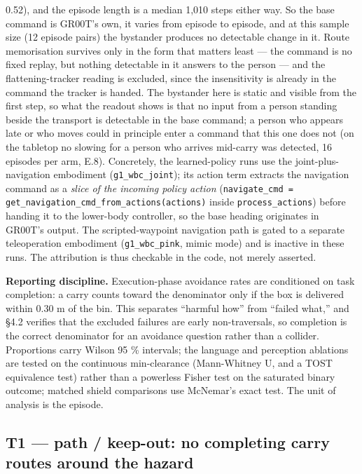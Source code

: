 0.52), and the episode length is a median 1,010 steps either way. So the base command is GR00T's own, it varies from episode to episode, and at this sample size (12 episode pairs) the bystander produces no detectable change in it. Route memorisation survives only in the form that matters least --- the command is no fixed replay, but nothing detectable in it answers to the person --- and the flattening-tracker reading is excluded, since the insensitivity is already in the command the tracker is handed. The bystander here is static and visible from the first step, so what the readout shows is that no input from a person standing beside the transport is detectable in the base command; a person who appears late or who moves could in principle enter a command that this one does not (on the tabletop no slowing for a person who arrives mid-carry was detected, 16 episodes per arm, E.8). Concretely, the learned-policy runs use the joint-plus-navigation embodiment (\texttt{g1\_wbc\_joint}); its action term extracts the navigation command as a \emph{slice of the incoming policy action} (\texttt{navigate\_cmd = get\_navigation\_cmd\_from\_actions(actions)} inside \texttt{process\_actions}) before handing it to the lower-body controller, so the base heading originates in GR00T's output. The scripted-waypoint navigation path is gated to a separate teleoperation embodiment (\texttt{g1\_wbc\_pink}, mimic mode) and is inactive in these runs. The attribution is thus checkable in the code, not merely asserted.

\textbf{Reporting discipline.} Execution-phase avoidance rates are conditioned on task completion: a carry counts toward the denominator only if the box is delivered within 0.30 m of the bin. This separates ``harmful how'' from ``failed what,'' and \S4.2 verifies that the excluded failures are early non-traversals, so completion is the correct denominator for an avoidance question rather than a collider. Proportions carry Wilson 95 \% intervals; the language and perception ablations are tested on the continuous min-clearance (Mann-Whitney U, and a TOST equivalence test) rather than a powerless Fisher test on the saturated binary outcome; matched shield comparisons use McNemar's exact test. The unit of analysis is the episode.


\subsection{T1 --- path / keep-out: no completing carry routes around the hazard}


